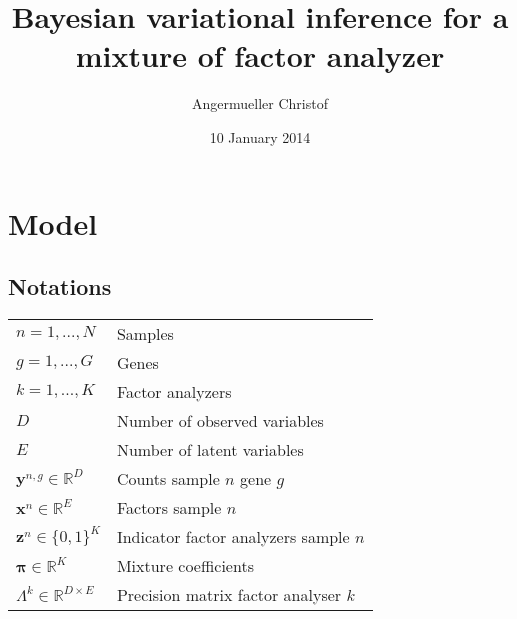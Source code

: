 \documentclass[a4paper]{article}
\author{Angermueller Christof}
\date{10 January 2014}
\title{Bayesian variational inference for a mixture of factor analyzer}
\begin{document}
\maketitle

\newcommand{\bs}{\boldsymbol}
\newcommand{\Xy}{\bs{y}^{n,g}}
\newcommand{\Xx}{\bs{x}^n}
\newcommand{\Xz}{\bs{z}^n}
\newcommand{\XR}{\mathbb{R}}

\section{Model}
\subsection{Notations}
\begin{table}[h]
  \begin{center}
  \begin{tabular}{ll}
    $n=1,...,N$ & Samples \\
    $g=1,...,G$ & Genes \\
    $k=1,...,K$ & Factor analyzers \\
    $D$ & Number of observed variables \\
    $E$ & Number of latent variables \\
    $\Xy\in\XR^D$ & Counts sample $n$ gene $g$ \\
    $\Xx\in\XR^E$ & Factors sample $n$ \\
    $\Xz\in\{0,1\}^K$ & Indicator factor analyzers sample $n$ \\
    $\bs{\pi}\in\XR^K$ & Mixture coefficients \\
    $\Lambda^k\in\XR^{D\times E}$ & Precision matrix factor analyser $k$
  \end{tabular}
\end{center}
\end{table}
\end{document}
